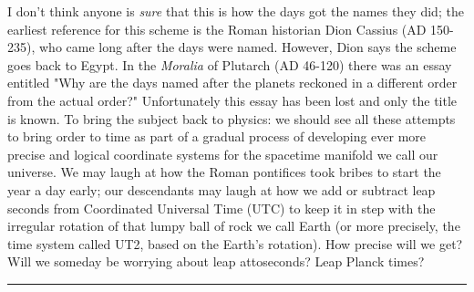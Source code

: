 I don't think anyone is \emph{sure} that this is how the days got the
names they did; the earliest reference for this scheme is the 
Roman historian Dion Cassius (AD 150-235), who came long after the
days were named.  However, Dion says the scheme goes back to Egypt.
In the \emph{Moralia} of Plutarch (AD 46-120) there was an essay entitled
"Why are the days named after the planets reckoned in a different order
from the actual order?"  Unfortunately this essay has been lost and
only the title is known.  
To bring the subject back to physics: we should see all these attempts
to bring order to time as part of a gradual process of developing
ever more precise and logical coordinate systems for the spacetime
manifold we call our universe.  We may laugh at how the Roman pontifices
took bribes to start the year a day early; our descendants may laugh
at how we add or subtract leap seconds from Coordinated Universal 
Time (UTC) to keep it in step with the irregular rotation of that lumpy 
ball of rock we call Earth (or more precisely, the time system called
UT2, based on the Earth's rotation).  How precise will we get?  Will 
we someday be worrying about leap attoseconds?  Leap Planck times?






 \par\noindent\rule{\textwidth}{0.4pt}

